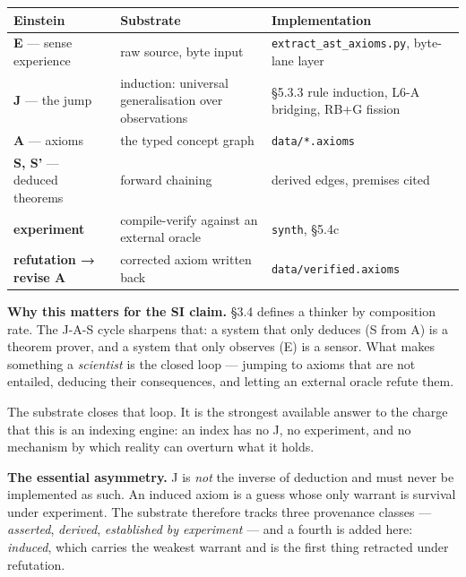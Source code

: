 \documentclass[
  11pt,
  a4paper,
]{article}
\begin{document}
\begin{longtable}[]{@{}
  >{\raggedright\arraybackslash}p{}
  >{\raggedright\arraybackslash}p{}
  >{\raggedright\arraybackslash}p{}@{}}
\toprule\noalign{}
\begin{minipage}[b]{\linewidth}\raggedright
Einstein
\end{minipage} & \begin{minipage}[b]{\linewidth}\raggedright
Substrate
\end{minipage} & \begin{minipage}[b]{\linewidth}\raggedright
Implementation
\end{minipage} \\
\midrule\noalign{}
\endhead
\bottomrule\noalign{}
\endlastfoot
\textbf{E} --- sense experience & raw source, byte input &
\texttt{extract\_ast\_axioms.py}, byte-lane layer \\
\textbf{J} --- the jump & induction: universal generalisation over
observations & §5.3.3 rule induction, L6-A bridging, RB+G fission \\
\textbf{A} --- axioms & the typed concept graph &
\texttt{data/*.axioms} \\
\textbf{S, S'} --- deduced theorems & forward chaining & 100 derived
edges, premises cited \\
\textbf{experiment} & compile-verify against an external oracle &
\texttt{synth}, §5.4c \\
\textbf{refutation → revise A} & corrected axiom written back &
\texttt{data/verified.axioms} \\
\end{longtable}

\textbf{Why this matters for the SI claim.} §3.4 defines a thinker by
composition rate. The J-A-S cycle sharpens that: a system that only
deduces (S from A) is a theorem prover, and a system that only observes
(E) is a sensor. What makes something a \emph{scientist} is the closed
loop --- jumping to axioms that are not entailed, deducing their
consequences, and letting an external oracle refute them.

The substrate closes that loop. It is the strongest available answer to
the charge that this is an indexing engine: an index has no J, no
experiment, and no mechanism by which reality can overturn what it
holds.

\textbf{The essential asymmetry.} J is \emph{not} the inverse of
deduction and must never be implemented as such. An induced axiom is a
guess whose only warrant is survival under experiment. The substrate
therefore tracks three provenance classes --- \emph{asserted},
\emph{derived}, \emph{established by experiment} --- and a fourth is
added here: \emph{induced}, which carries the weakest warrant and is the
first thing retracted under refutation.
\end{document}
